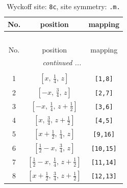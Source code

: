 \documentclass[fleqn,8pt]{jsarticle}
\begin{document}
\begin{longtable}{ccc}
\caption{Wyckoff site: {\tt 8c}, site symmetry: {\tt .m.}}
 \\
 \hline \hline
No. & position & mapping \\ \hline \endfirsthead

\multicolumn{2}{l}{\tablename\ \thetable{}} \\
 \hline \hline
No. & position & mapping \\ \hline \endhead

 \hline \hline
\multicolumn{2}{r}{\footnotesize\it continued ...} \\ \endfoot

 \hline \hline
\multicolumn{2}{r}{} \\ \endlastfoot

1 & $\left[ x,\, \frac{1}{4},\, z \right]$ & {\tt [1,8]} \\ \hline
2 & $\left[ - x,\, \frac{3}{4},\, z \right]$ & {\tt [2,7]} \\ \hline
3 & $\left[ - x,\, \frac{1}{4},\, z + \frac{1}{2} \right]$ & {\tt [3,6]} \\ \hline
4 & $\left[ x,\, \frac{3}{4},\, z + \frac{1}{2} \right]$ & {\tt [4,5]} \\ \hline
5 & $\left[ x + \frac{1}{2},\, \frac{1}{4},\, z \right]$ & {\tt [9,16]} \\ \hline
6 & $\left[ \frac{1}{2} - x,\, \frac{3}{4},\, z \right]$ & {\tt [10,15]} \\ \hline
7 & $\left[ \frac{1}{2} - x,\, \frac{1}{4},\, z + \frac{1}{2} \right]$ & {\tt [11,14]} \\ \hline
8 & $\left[ x + \frac{1}{2},\, \frac{3}{4},\, z + \frac{1}{2} \right]$ & {\tt [12,13]} \\
\end{longtable}
\renewcommand{\arraystretch}{1.2}
\end{document}
